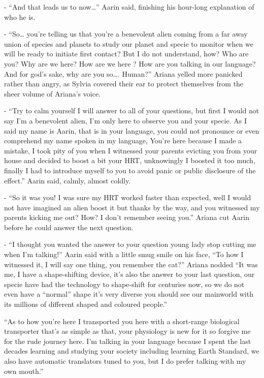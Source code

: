 \documentclass[hidelinks,12pt,a4paper]{book}
\begin{document}
- “And that leads us to now…” Aarin said, finishing his hour-long explanation of who he is.\par
\bigskip

- “So… you're telling us that you're a benevolent alien coming from a far 
away union of species and planets to study our planet and specie to monitor when we will be 
ready to initiate first contact? But I do not understand, how? Who are you? Why are we here? 
How are we here ? How are you talking in our language? And for god's sake, why are you so…. Human?” 
Ariana yelled more panicked rather than angry, as Sylvia covered their ear to protect themselves 
from the sheer volume of Ariana's voice.\par
\bigskip

- “Try to calm yourself I will answer to all of your questions, 
but first I would not say I'm a benevolent alien, I'm only here to 
observe you and your specie. As I said my name is Aarin, that is in your language, 
you could not pronounce or even comprehend my name spoken in my language, You're here because I made a mistake,
 I took pity of you when I witnessed your parents evicting you from your 
 house and decided to boost a bit your HRT, unknowingly I boosted it too much, finally I had to 
 introduce myself to you to avoid panic or public disclosure of the effect.” Aarin said, calmly, almost coldly.\par
 \bigskip

- “So it was you! I was sure my HRT worked faster than expected, well I would not have imagined an alien boost it 
but thanks by the way, and you witnessed my parents kicking me out? How? I don't remember seeing you.”
 Ariana cut Aarin before he could answer the next question.\par
 \bigskip

- “I thought you wanted the answer to your question young lady stop cutting me when I'm talking!” 
Aarin said with a little smug smile on his face, “To how I witnessed it, I will say one thing, you remember the cat?” 
Ariana nodded “It was me, I have a shape-shifting device, it's also the answer to your last question, 
our specie have had the technology to shape-shift for centuries now, so we do not even have a “normal” shape it's 
very diverse you should see our mainworld with its millions of different shaped and coloured people.”\par
\bigskip

“As to how you're here I transported you here with a short-range biological transporter that's as simple as that, 
your physiology is new for it so forgive me for the rude journey here. I'm talking in your language because I spent the
 last decades learning and studying your society including learning Earth Standard, we also have automatic translators 
 tuned to you, but I do prefer talking with my own mouth.”\par
 \bigskip
\end{document}
